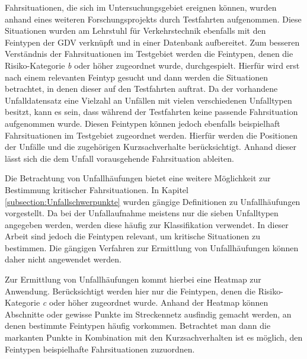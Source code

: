 Fahrsituationen, die sich im Untersuchungsgebiet ereignen können, wurden anhand eines weiteren Forschungsprojekts durch Testfahrten aufgenommen. Diese Situationen wurden am Lehrstuhl für Verkehrstechnik ebenfalls mit den Feintypen der GDV verknüpft und in einer Datenbank aufbereitet. Zum besseren Verständnis der Fahrsituationen im Testgebiet werden die Feintypen, denen die Risiko-Kategorie \textit{b} oder höher zugeordnet wurde, durchgespielt. Hierfür wird erst nach einem relevanten Feintyp gesucht und dann werden die Situationen betrachtet, in denen dieser auf den Testfahrten auftrat. Da der vorhandene Unfalldatensatz eine Vielzahl an Unfällen mit vielen verschiedenen Unfalltypen besitzt, kann es sein, dass während der Testfahrten keine passende Fahrsituation aufgenommen wurde. Diesen Feintypen können jedoch ebenfalls beispielhaft Fahrsituationen im Testgebiet zugeordnet werden. Hierfür werden die Positionen der Unfälle und die zugehörigen Kurzsachverhalte berücksichtigt. Anhand dieser lässt sich die dem Unfall vorausgehende Fahrsituation ableiten.

Die Betrachtung von Unfallhäufungen bietet eine weitere Möglichkeit zur Bestimmung kritischer Fahrsituationen. In Kapitel \ref{subsection:Unfallschwerpunkte} wurden gängige Definitionen zu Unfallhäufungen vorgestellt. Da bei der Unfallaufnahme meistens nur die sieben Unfalltypen angegeben werden, werden diese häufig  zur Klassifikation verwendet. In dieser Arbeit sind jedoch die Feintypen relevant, um kritische Situationen zu bestimmen. Die gängigen Verfahren zur Ermittlung von Unfallhäufungen können daher nicht angewendet werden.

Zur Ermittlung von Unfallhäufungen kommt hierbei eine Heatmap zur Anwendung. Berücksichtigt werden hier nur die Feintypen, denen die Risiko-Kategorie \textit{c} oder höher zugeordnet wurde. Anhand der Heatmap können Abschnitte oder gewisse Punkte im Streckennetz ausfindig gemacht werden, an denen bestimmte Feintypen häufig vorkommen. Betrachtet man dann die markanten Punkte in Kombination mit den Kurzsachverhalten ist es möglich, den Feintypen beispielhafte Fahrsituationen zuzuordnen.